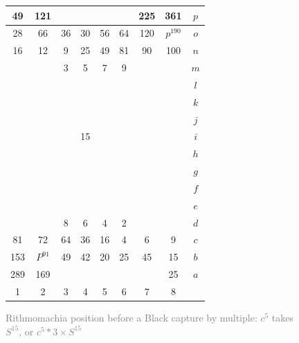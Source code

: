 \documentclass[14pt]{extarticle}
\begin{document}
\begin{figure}[H] 
\centering 
\begin{tabular}{|c|c|c|c|c|c|c|c||c} \hline
\squadfill{\,}49 & \squadfill{\,}121 & \quad  & \quad  & \quad  & \quad  & \squadfill{\,}225 & \squadfill{\,}361 & $p$ \\ \hline
\squadfill{\,}28 & \squadfill{\,}66 & \trianglepafill{\,}36 & \trianglepafill{\,}30 & \trianglepafill{\,}56 & \trianglepafill{\,}64 & \squadfill{\,}120 & \rhombusfill{\,}$p^{190}$ & $o$ \\ \hline
\trianglepafill{\,}16 & \trianglepafill{\,}12 & \circletfill{\,}9 & \circletfill{\,}25 & \circletfill{\,}49 & \circletfill{\,}81 & \trianglepafill{\,}90 & \trianglepafill{\,}100 & $n$ \\ \hline
\quad  & \quad  & \circletfill{\,}3 & \circletfill{\,}5 & \circletfill{\,}7 & \circletfill{\,}9 & \quad  & \quad  & $m$ \\ \hline
\quad  & \quad  & \quad  & \quad  & \quad  & \quad  & \quad  & \quad  & $l$ \\ \hline
\quad  & \quad  & \quad  & \quad  & \quad  & \quad  & \quad  & \quad  & $k$ \\ \hline
\quad  & \quad  & \quad  & \quad  & \quad  & \quad  & \quad  & \quad  & $j$ \\ \hline
\quad  & \quad  & \quad  & \squad{\,}15 & \quad  & \quad  & \quad  & \quad  & $i$ \\ \hline
\quad  & \quad  & \quad  & \quad  & \quad  & \quad  & \quad  & \quad  & $h$ \\ \hline
\quad  & \quad  & \quad  & \quad  & \quad  & \quad  & \quad  & \quad  & $g$ \\ \hline
\quad  & \quad  & \quad  & \quad  & \quad  & \quad  & \quad  & \quad  & $f$ \\ \hline
\quad  & \quad  & \quad  & \quad  & \quad  & \quad  & \quad  & \quad  & $e$ \\ \hline
\quad  & \quad  & \circlet{\,}8 & \circlet{\,}6 & \circlet{\,}4 & \circlet{\,}2 & \quad  & \quad  & $d$ \\ \hline
\trianglepa{\,}81 & \trianglepa{\,}72 & \circlet{\,}64 & \circlet{\,}36 & \circlet{\,}16 & \circlet{\,}4 & \trianglepa{\,}6 & \trianglepa{\,}9 & $c$ \\ \hline
\squad{\,}153 & \rhombus{\,}$P^{91}$ & \trianglepa{\,}49 & \trianglepa{\,}42 & \trianglepa{\,}20 & \trianglepa{\,}25 & \squad{\,}45 & \squad{\,}15 & $b$ \\ \hline
\squad{\,}289 & \squad{\,}169 & \quad  & \quad  & \quad  & \quad  & \quad  & \squad{\,}25 & $a$ \\ \hline
1 &  2 &  3 &  4 &  5 &  6 &  7 &  8  &  \\
\end{tabular} 
\caption{\textcolor{gray}{Rithmomachia position before a Black capture by multiple: $c^5$ takes $S^{15}$, or $c^5*3\times S^{15}$}}
\label{fig:rithmomachia-capture-by-multiple-divisor-with-pyramid} 
\end{figure}
\end{document}
